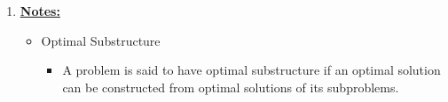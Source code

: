 \documentclass[12pt]{article}
\begin{document}
\begin{enumerate}[1.]
    \item

    \bigskip

    \underline{\textbf{Notes:}}

    \bigskip

    \begin{itemize}
        \item Optimal Substructure

        \begin{itemize}
            \item A problem is said to have optimal substructure if an optimal solution
            can be constructed from optimal solutions of its subproblems.
        \end{itemize}
    \end{itemize}

\end{enumerate}
\end{document}
